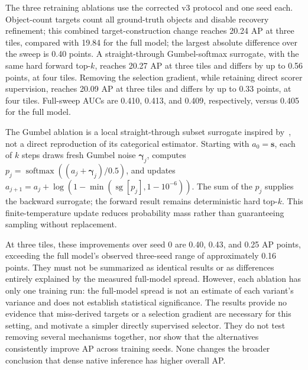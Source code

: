 \documentclass[conference]{IEEEtran}
\begin{document}
The three retraining ablations use the corrected v3 protocol and one seed each. Object-count targets count all ground-truth objects and disable recovery refinement; this combined target-construction change reaches 20.24 AP at three tiles, compared with 19.84 for the full model; the largest absolute difference over the sweep is 0.40 points. A straight-through Gumbel-softmax surrogate, with the same hard forward top-$k$, reaches 20.27 AP at three tiles and differs by up to 0.56 points, at four tiles. Removing the selection gradient, while retaining direct scorer supervision, reaches 20.09 AP at three tiles and differs by up to 0.33 points, at four tiles. Full-sweep AUCs are 0.410, 0.413, and 0.409, respectively, versus 0.405 for the full model.

The Gumbel ablation is a local straight-through subset surrogate inspired by~\cite{jang2017gumbel}, not a direct reproduction of its categorical estimator. Starting with $a_0=\mathbf s$, each of $k$ steps draws fresh Gumbel noise $\boldsymbol\gamma_j$, computes $p_j=\operatorname{softmax}((a_j+\boldsymbol\gamma_j)/0.5)$, and updates $a_{j+1}=a_j+\log(1-\min(\operatorname{sg}[p_j],1-10^{-6}))$. The sum of the $p_j$ supplies the backward surrogate; the forward result remains deterministic hard top-$k$. This finite-temperature update reduces probability mass rather than guaranteeing sampling without replacement.

At three tiles, these improvements over seed 0 are 0.40, 0.43, and 0.25 AP points, exceeding the full model's observed three-seed range of approximately 0.16 points. They must not be summarized as identical results or as differences entirely explained by the measured full-model spread. However, each ablation has only one training run: the full-model spread is not an estimate of each variant's variance and does not establish statistical significance. The results provide no evidence that miss-derived targets or a selection gradient are necessary for this setting, and motivate a simpler directly supervised selector. They do not test removing several mechanisms together, nor show that the alternatives consistently improve AP across training seeds. None changes the broader conclusion that dense native inference has higher overall AP.
\end{document}
